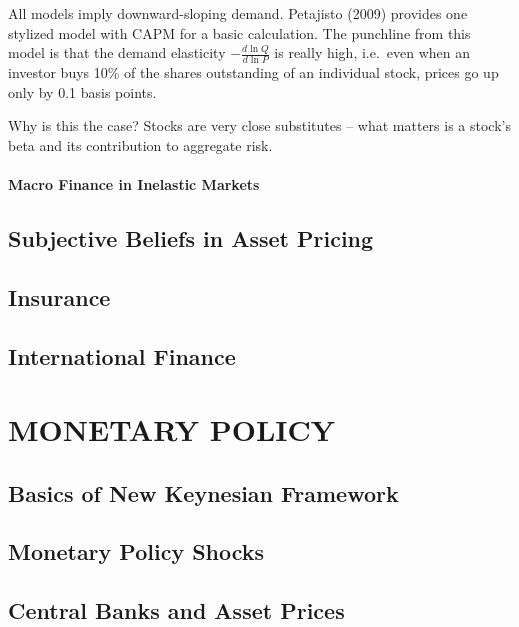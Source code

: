 \documentclass[
]{book}
\begin{document}
All models imply downward-sloping demand. Petajisto (2009) provides one stylized model with CAPM for a basic calculation. The punchline from this model is that the demand elasticity \(-\frac{d\ln Q}{d\ln P}\) is really high, i.e.~even when an investor buys 10\% of the shares outstanding of an individual stock, prices go up only by 0.1 basis points.

Why is this the case? Stocks are very close substitutes -- what matters is a stock's beta and its contribution to aggregate risk.

\hypertarget{macro-finance-in-inelastic-markets}{%
\subsection{Macro Finance in Inelastic Markets}\label{macro-finance-in-inelastic-markets}}

\hypertarget{subjective-beliefs-in-asset-pricing}{%
\chapter{Subjective Beliefs in Asset Pricing}\label{subjective-beliefs-in-asset-pricing}}

\hypertarget{insurance}{%
\chapter{Insurance}\label{insurance}}

\hypertarget{international-finance}{%
\chapter{International Finance}\label{international-finance}}

\hypertarget{part-monetary-policy}{%
\part*{MONETARY POLICY}\label{part-monetary-policy}}

\hypertarget{basics-of-new-keynesian-framework}{%
\chapter{Basics of New Keynesian Framework}\label{basics-of-new-keynesian-framework}}

\hypertarget{monetary-policy-shocks}{%
\chapter{Monetary Policy Shocks}\label{monetary-policy-shocks}}

\hypertarget{central-banks-and-asset-prices}{%
\chapter{Central Banks and Asset Prices}\label{central-banks-and-asset-prices}}

  
\end{document}
